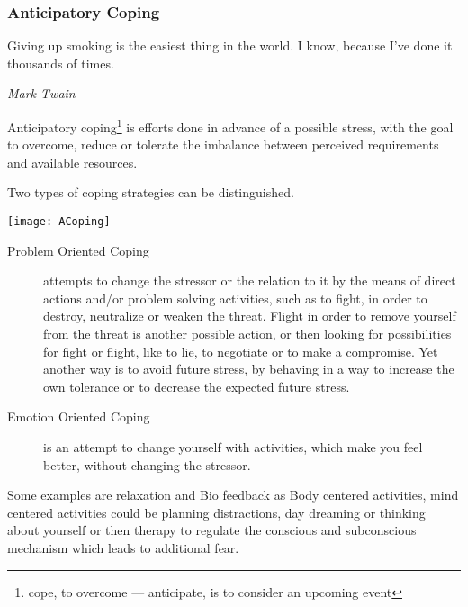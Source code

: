 \documentclass[../Book.Stress_regulation.tex]{subfiles}
\begin{document}
\subsubsection{Anticipatory Coping}

\epigraph{Giving up smoking is the easiest thing in the world. I know, because I've done it thousands of times.}{\textit{Mark Twain}}

Anticipatory coping\footnote{cope, to overcome --- anticipate, is to consider an upcoming event} is efforts done {in advance} of a possible stress,  with the goal to {overcome}, reduce or tolerate the {imbalance between perceived requirements and available resources}.

Two types of coping strategies can be distinguished.

\texttt{[image: ACoping]}

 \begin{description}
\item[Problem Oriented Coping] attempts to change the stressor or the relation to it by the means of {direct actions} and/or problem solving activities, such as to fight, in order to destroy, neutralize or weaken the threat. Flight in order to remove yourself from the threat is another possible action, or then looking for possibilities for fight or flight, like to lie, to negotiate or to make a compromise. Yet another way is to avoid future stress, by behaving in a way to increase the own tolerance or to decrease the expected future stress.
\item[Emotion Oriented Coping] is an attempt to change yourself with activities, which make you {feel better}, without changing the stressor.
\end{description}

Some examples are relaxation and Bio feedback as Body centered activities, mind centered activities could be planning distractions, day dreaming or thinking about yourself or then therapy to regulate the conscious and subconscious mechanism which leads to additional fear.
\end{document}
